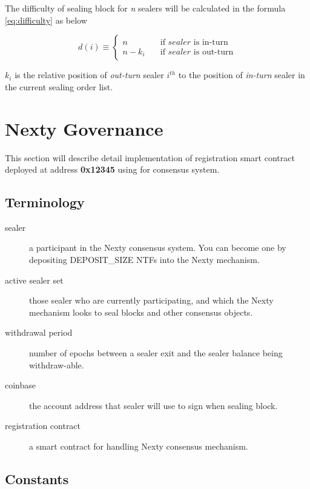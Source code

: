 \documentclass[12pt,oneside]{amsart}
\begin{document}
\begin{multicols}{2}
The difficulty of sealing block for \textit{n} sealers will be calculated in the formula \eqref{eq:difficulty} as below

\begin{equation}\label{eq:difficulty}
    d(i) \equiv
    \begin{cases}
    	n	& \quad \text{if } sealer \text{ is in-turn}\\
	n - k_i & \quad \text{if } sealer \text{ is out-turn}
    \end{cases}
\end{equation}

${k_i}$ is the relative position of \textit{out-turn} sealer ${i^{th}}$ to the position of \textit{in-turn} sealer in the current sealing order list.

\section{Nexty Governance}\label{sec:governace}

This section will describe detail implementation of registration smart contract deployed at address \textbf{0x12345} using for consensus system.

\subsection{Terminology}

\begin{description}
\item[sealer] a participant in the Nexty consensus system. You can become one by depositing {\small DEPOSIT\_SIZE} {\small NTFs} into the Nexty mechanism.
\item[active sealer set] those sealer who are currently participating, and which the Nexty mechanism looks to seal blocks and other consensus objects.
\item[withdrawal period] number of epochs between a sealer exit and the sealer balance being withdraw-able.
\item[coinbase] the account address that sealer will use to sign when sealing block.
\item[registration contract] a smart contract for handling Nexty consensus mechanism.
\end{description}

\subsection{Constants}


\end{multicols}
\end{document}
